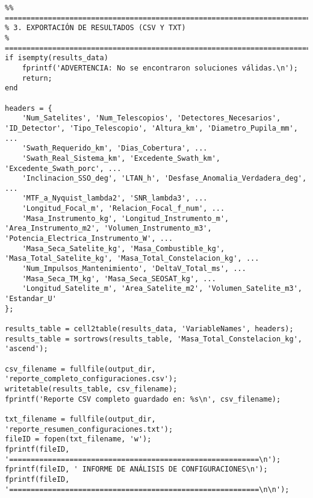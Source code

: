 \begin{verbatim}
%% ========================================================================
% 3. EXPORTACIÓN DE RESULTADOS (CSV Y TXT)
% ========================================================================
if isempty(results_data)
    fprintf('ADVERTENCIA: No se encontraron soluciones válidas.\n');
    return;
end

headers = {
    'Num_Satelites', 'Num_Telescopios', 'Detectores_Necesarios', 'ID_Detector', 'Tipo_Telescopio', 'Altura_km', 'Diametro_Pupila_mm', ...
    'Swath_Requerido_km', 'Dias_Cobertura', ...
    'Swath_Real_Sistema_km', 'Excedente_Swath_km', 'Excedente_Swath_porc', ...
    'Inclinacion_SSO_deg', 'LTAN_h', 'Desfase_Anomalia_Verdadera_deg', ...
    'MTF_a_Nyquist_lambda2', 'SNR_lambda3', ...
    'Longitud_Focal_m', 'Relacion_Focal_f_num', ...
    'Masa_Instrumento_kg', 'Longitud_Instrumento_m', 'Area_Instrumento_m2', 'Volumen_Instrumento_m3', 'Potencia_Electrica_Instrumento_W', ...
    'Masa_Seca_Satelite_kg', 'Masa_Combustible_kg', 'Masa_Total_Satelite_kg', 'Masa_Total_Constelacion_kg', ...
    'Num_Impulsos_Mantenimiento', 'DeltaV_Total_ms', ...
    'Masa_Seca_TM_kg', 'Masa_Seca_SEOSAT_kg', ...
    'Longitud_Satelite_m', 'Area_Satelite_m2', 'Volumen_Satelite_m3', 'Estandar_U'
};

results_table = cell2table(results_data, 'VariableNames', headers);
results_table = sortrows(results_table, 'Masa_Total_Constelacion_kg', 'ascend');

csv_filename = fullfile(output_dir, 'reporte_completo_configuraciones.csv');
writetable(results_table, csv_filename);
fprintf('Reporte CSV completo guardado en: %s\n', csv_filename);

txt_filename = fullfile(output_dir, 'reporte_resumen_configuraciones.txt');
fileID = fopen(txt_filename, 'w');
fprintf(fileID, '==========================================================\n');
fprintf(fileID, ' INFORME DE ANÁLISIS DE CONFIGURACIONES\n');
fprintf(fileID, '==========================================================\n\n');


\end{verbatim}
